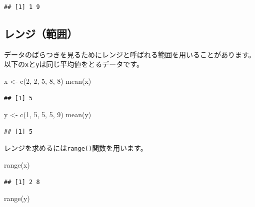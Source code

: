 \documentclass[
  12pt,
]{book}
\newenvironment{Shaded}{\begin{snugshade}}{\end{snugshade}}
\newcommand{\DecValTok}[1]{\textcolor[rgb]{0.00,0.00,0.81}{#1}}
\newcommand{\FunctionTok}[1]{\textcolor[rgb]{0.00,0.00,0.00}{#1}}
\newcommand{\NormalTok}[1]{#1}
\newcommand{\OtherTok}[1]{\textcolor[rgb]{0.56,0.35,0.01}{#1}}
\begin{document}
\begin{verbatim}
## [1] 1 9
\end{verbatim}

\hypertarget{ux30ecux30f3ux30b8ux7bc4ux56f2}{%
\subsection{レンジ（範囲）}\label{ux30ecux30f3ux30b8ux7bc4ux56f2}}

データのばらつきを見るためにレンジと呼ばれる範囲を用いることがあります。以下の\texttt{x}と\texttt{y}は同じ平均値をとるデータです。

\begin{Shaded}
\begin{Highlighting}[]
\NormalTok{x }\OtherTok{\textless{}{-}} \FunctionTok{c}\NormalTok{(}\DecValTok{2}\NormalTok{, }\DecValTok{2}\NormalTok{, }\DecValTok{5}\NormalTok{, }\DecValTok{8}\NormalTok{, }\DecValTok{8}\NormalTok{)}
\FunctionTok{mean}\NormalTok{(x)}
\end{Highlighting}
\end{Shaded}

\begin{verbatim}
## [1] 5
\end{verbatim}

\begin{Shaded}
\begin{Highlighting}[]
\NormalTok{y }\OtherTok{\textless{}{-}} \FunctionTok{c}\NormalTok{(}\DecValTok{1}\NormalTok{, }\DecValTok{5}\NormalTok{, }\DecValTok{5}\NormalTok{, }\DecValTok{5}\NormalTok{, }\DecValTok{9}\NormalTok{)}
\FunctionTok{mean}\NormalTok{(y)}
\end{Highlighting}
\end{Shaded}

\begin{verbatim}
## [1] 5
\end{verbatim}

レンジを求めるには\texttt{range()}関数を用います。

\begin{Shaded}
\begin{Highlighting}[]
\FunctionTok{range}\NormalTok{(x)}
\end{Highlighting}
\end{Shaded}

\begin{verbatim}
## [1] 2 8
\end{verbatim}

\begin{Shaded}
\begin{Highlighting}[]
\FunctionTok{range}\NormalTok{(y)}
\end{Highlighting}
\end{Shaded}
\end{document}
